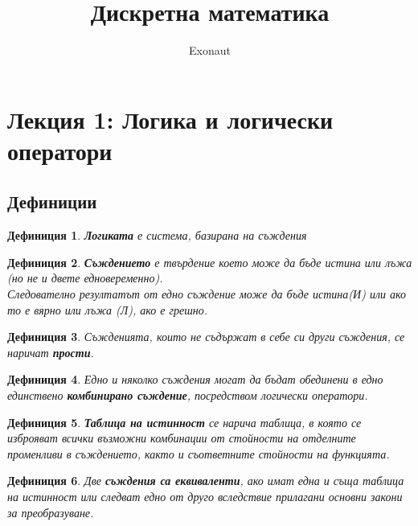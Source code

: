 \documentclass[fleqn, 12pt]{article}
\title{Дискретна математика}
\author{Exonaut}
\newtheorem{definition}{Дефиниция}[subsection]
\theoremstyle{definition}
\begin{document}
\maketitle
{}

\newpage
{}

\tableofcontents
\newpage

\section{Лекция 1: Логика и логически оператори}

\subsection{Дефиниции}

\begin{definition}
\textbf{Логиката} е система, базирана на съждения
\end{definition}

\begin{definition}
\textbf{Съждението} е твърдение което може да бъде истина или лъжа (но не и двете едновеременно).\\
Следователно резултатът от едно съждение може да бъде истина(И) или ако то е вярно или лъжа (Л), ако е грешно.
\end{definition}

\begin{definition}
Съжденията, които не съдържат в себе си други съждения, се наричат \textbf{прости}.
\end{definition}

\begin{definition}
Едно и няколко съждения могат да бъдат обединени в едно единствено \textbf{комбинирано съждение}, посредством логически оператори. 
\end{definition}

\begin{definition}
\textbf{Таблица на истинност} се нарича таблица, в която се изброяват всички възможни комбинации от стойности  на отделните променливи в съждението, както и съответните стойности на функцията. 
\end{definition}

\begin{definition}
Две \textbf{съждения са еквиваленти}, ако имат една и съща таблица на истинност или следват едно от друго вследствие прилагани основни закони за преобразуване. 
\end{definition}
\newpage
\end{document}
